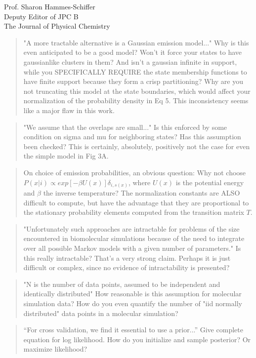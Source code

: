 \documentclass{letter}
\begin{document}
\begin{letter}{Prof. Sharon Hammes-Schiffer \\ Deputy Editor of JPC B \\ The Journal of Physical Chemistry}
\begin{quote}
"A more tractable alternative is a Gaussian emission model..."  Why is this even anticipated to be a good model?  Won't it force your states to have gaussianlike clusters in them?  And isn't a gaussian infinite in support, while you SPECIFICALLY REQUIRE the state membership functions to have finite support because they form a crisp partitioning?  Why are you not truncating this model at the state boundaries, which would affect your normalization of the probability density in Eq 5.  This inconsistency seems like a major flaw in this work.
\end{quote}

\begin{quote}
"We assume that the overlaps are small..."  Is this enforced by some condition on sigma and mu for neighboring states?  Has this assumption been checked?  This is certainly, absolutely, positively not the case for even the simple model in Fig 3A.
\end{quote}

\begin{quote}
On choice of emission probabilities, an obvious question: Why not choose $P(x|i) \propto exp[-\beta U(x)] \delta_{i,s(x)}$, where $U(x)$ is the potential energy and $\beta$ the inverse temperature?  The normalization constants are ALSO difficult to compute, but have the advantage that they are proportional to the stationary probability elements computed from the transition matrix $T$.
\end{quote}

\begin{quote}
"Unfortunately such approaches are intractable for problems of the size encountered in biomolecular simulations because of the need to integrate over all possible Markov models with a given number of parameters."  Is this really intractable?  That's a very strong claim.  Perhaps it is just difficult or complex, since no evidence of intractability is presented?
\end{quote}

\begin{quote}
"N is the number of data points, assumed to be independent and identically distributed"  How reasonable is this assumption for molecular simulation data?  How do you even quantify the number of "iid normally distributed" data points in a molecular simulation?
\end{quote}

\begin{quote}
``For cross validation, we find it essential to use a prior...''  Give complete equation for log likelihood.  How do you initialize and sample posterior?  Or maximize likelihood?
\end{quote}



\end{letter}
\end{document}
